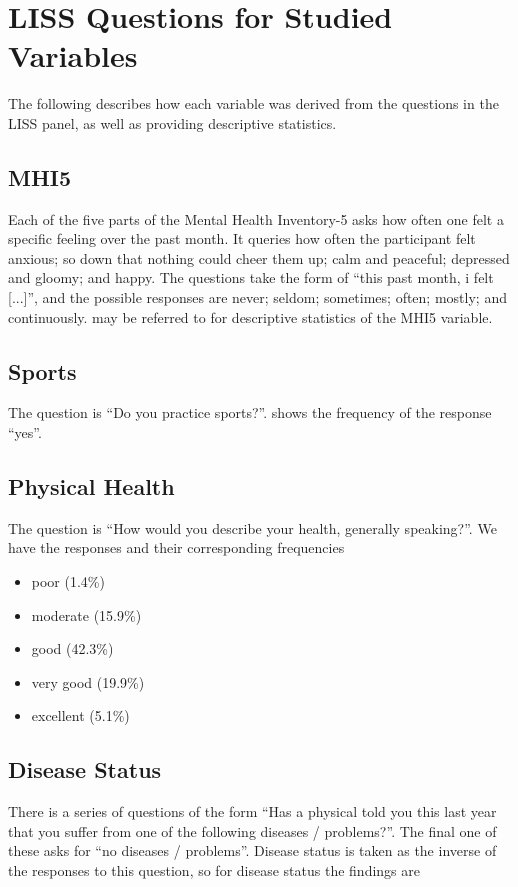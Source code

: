 \chapter{LISS Questions for Studied Variables}
\label{chap:app:liss_questions}
The following describes how each variable was derived from the questions in the LISS panel, as well as providing
descriptive statistics.

\section*{MHI5}
Each of the five parts of the Mental Health Inventory-5 asks how often one felt a specific feeling over the past month.
It queries how often the participant felt anxious; so down that nothing could cheer them up; calm and peaceful;
depressed and gloomy; and happy.
The questions take the form of ``this past month, i felt [...]'', and the possible responses are never; seldom; sometimes;
often; mostly; and continuously.
 may be referred to for descriptive statistics of the MHI5 variable.

\section*{Sports}
The question is ``Do you practice sports?''.  shows the frequency of
the response ``yes''.

\section*{Physical Health}
The question is ``How would you describe your health, generally speaking?''.
We have the responses and their corresponding frequencies

\begin{itemize}[nolistsep]
    \item poor (1.4\%)
    \item moderate (15.9\%)
    \item good (42.3\%)
    \item very good (19.9\%)
    \item excellent (5.1\%)
\end{itemize}

\section*{Disease Status}
There is a series of questions of the form ``Has a physical told you this last year that you suffer from one of the following
diseases / problems?''. The final one of these asks for ``no diseases / problems''. Disease status is taken
as the inverse of the responses to this question, so for disease status the findings are

